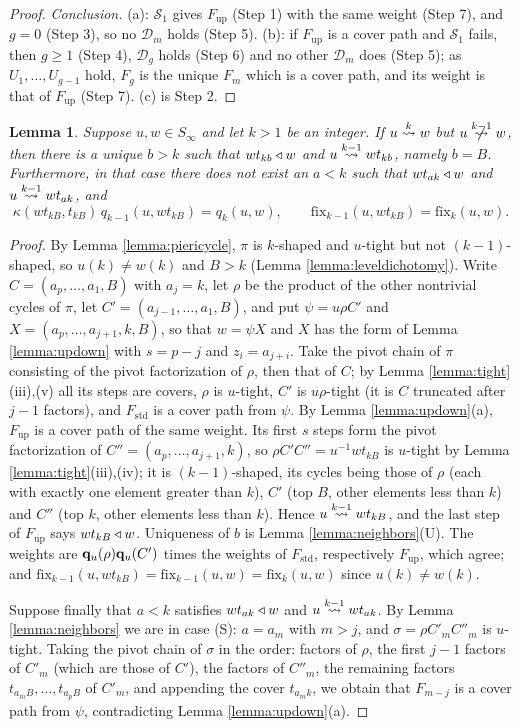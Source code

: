 \documentclass{amsart}
\newtheorem{lemma}{Lemma}[section]
\theoremstyle{definition}
\theoremstyle{remark}
\numberwithin{equation}{section}
\newcommand{\xrightsquigarrow}[2][]{%
	\mathrel{\mathop{\rightsquigarrow}\limits^{\scriptstyle #2}%
	\ifx\hfuzz#1\hfuzz\else_{\scriptstyle #1}\fi}%
}
\newcommand{\tom}[1]{\ensuremath{\xrightsquigarrow{#1}}}
\newcommand{\fx}{\mathrm{fix}}
\begin{document}
\begin{proof}
\emph{Conclusion.} (a): $\mathcal S_1$ gives $F_{\mathrm{up}}$ (Step 1) with the same weight (Step 7), and $g=0$ (Step 3), so no $\mathcal D_m$ holds (Step 5). (b): if $F_{\mathrm{up}}$ is a cover path and $\mathcal S_1$ fails, then $g\geq1$ (Step 4), $\mathcal D_g$ holds (Step 6) and no other $\mathcal D_m$ does (Step 5); as $U_1,\ldots,U_{g-1}$ hold, $F_g$ is the unique $F_m$ which is a cover path, and its weight is that of $F_{\mathrm{up}}$ (Step 7). (c) is Step 2.
\end{proof}

\begin{lemma} \label{lemma:pieriknotkn1}
Suppose $u,w\in S_\infty$ and let $k>1$ be an integer. If $u\tom{k} w$ but $u\ntom{k-1} w$, then there is a unique $b>k$ such that $wt_{kb}\triangleleft w$ and $u\tom{k-1} wt_{kb}$, namely $b=B$. Furthermore, in that case there does not exist an $a<k$ such that $wt_{ak}\triangleleft w$ and $u\tom{k-1} wt_{ak}$, and
$$\kappa(wt_{kB},t_{kB})\,q_{k-1}(u,wt_{kB})=q_k(u,w),\qquad \fx_{k-1}(u,wt_{kB})=\fx_k(u,w).$$
\end{lemma}
\begin{proof}
By Lemma \ref{lemma:piericycle}, $\pi$ is $k$-shaped and $u$-tight but not $(k-1)$-shaped, so $u(k)\neq w(k)$ and $B>k$ (Lemma \ref{lemma:leveldichotomy}). Write $C=(a_p,\ldots,a_1,B)$ with $a_j=k$, let $\rho$ be the product of the other nontrivial cycles of $\pi$, let $C'=(a_{j-1},\ldots,a_1,B)$, and put $\psi=u\rho C'$ and $X=(a_p,\ldots,a_{j+1},k,B)$, so that $w=\psi X$ and $X$ has the form of Lemma \ref{lemma:updown} with $s=p-j$ and $z_i=a_{j+i}$. Take the pivot chain of $\pi$ consisting of the pivot factorization of $\rho$, then that of $C$; by Lemma \ref{lemma:tight}(iii),(v) all its steps are covers, $\rho$ is $u$-tight, $C'$ is $u\rho$-tight (it is $C$ truncated after $j-1$ factors), and $F_{\mathrm{std}}$ is a cover path from $\psi$. By Lemma \ref{lemma:updown}(a), $F_{\mathrm{up}}$ is a cover path of the same weight. Its first $s$ steps form the pivot factorization of $C''=(a_p,\ldots,a_{j+1},k)$, so $\rho C'C''=u^{-1}wt_{kB}$ is $u$-tight by Lemma \ref{lemma:tight}(iii),(iv); it is $(k-1)$-shaped, its cycles being those of $\rho$ (each with exactly one element greater than $k$), $C'$ (top $B$, other elements less than $k$) and $C''$ (top $k$, other elements less than $k$). Hence $u\tom{k-1}wt_{kB}$, and the last step of $F_{\mathrm{up}}$ says $wt_{kB}\triangleleft w$. Uniqueness of $b$ is Lemma \ref{lemma:neighbors}(U). The weights are $\mathbf{q}_u(\rho)\mathbf{q}_u(C')$ times the weights of $F_{\mathrm{std}}$, respectively $F_{\mathrm{up}}$, which agree; and $\fx_{k-1}(u,wt_{kB})=\fx_{k-1}(u,w)=\fx_k(u,w)$ since $u(k)\neq w(k)$.

Suppose finally that $a<k$ satisfies $wt_{ak}\triangleleft w$ and $u\tom{k-1}wt_{ak}$. By Lemma \ref{lemma:neighbors} we are in case (S): $a=a_m$ with $m>j$, and $\sigma=\rho C'_mC''_m$ is $u$-tight. Taking the pivot chain of $\sigma$ in the order: factors of $\rho$, the first $j-1$ factors of $C'_m$ (which are those of $C'$), the factors of $C''_m$, the remaining factors $t_{a_mB},\ldots,t_{a_pB}$ of $C'_m$, and appending the cover $t_{a_mk}$, we obtain that $F_{m-j}$ is a cover path from $\psi$, contradicting Lemma \ref{lemma:updown}(a).
\end{proof}
\end{document}
